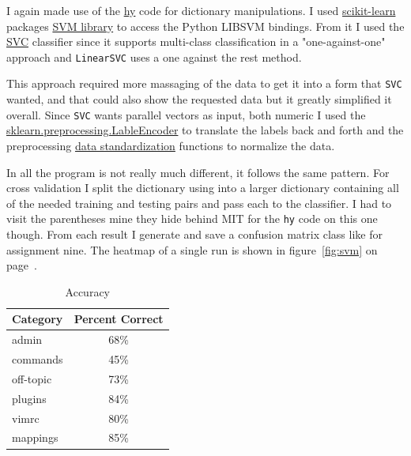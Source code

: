 \documentclass[12pt, a4paper]{article}
\newcommand{\code}[1]{\texttt{#1}}
\begin{document}
I again made use of the \href{https://github.com/hylang/hy}{hy} code for dictionary manipulations. I used \href{http://scikit-learn.org/stable/documentation.html}{scikit-learn} packages \href{http://scikit-learn.org/stable/modules/svm.html}{SVM library} to access the Python LIBSVM bindings. From it I used the \href{http://scikit-learn.org/stable/modules/generated/sklearn.svm.SVC.html#sklearn.svm.SVC}{SVC} classifier since it supports multi-class classification in a "one-against-one" approach and \code{LinearSVC} uses a one against the rest method.

This approach required more massaging of the data to get it into a form that \code{SVC} wanted, and that could also show the requested data but it greatly simplified it overall. Since \code{SVC} wants parallel vectors as input, both numeric I used the \href{http://scikit-learn.org/stable/modules/generated/sklearn.preprocessing.LabelEncoder.html}{sklearn.preprocessing.LableEncoder} to translate the labels back and forth and the preprocessing \href{http://scikit-learn.org/stable/modules/preprocessing.html#preprocessing}{data standardization} functions to normalize the data.

In all the program is not really much different, it follows the same pattern. For cross validation I split the dictionary using into a larger dictionary containing all of the needed training and testing pairs and pass each to the classifier. I had to visit the parentheses mine they hide behind MIT for the \code{hy} code on this one though. From each result I generate and save a confusion matrix class like for assignment nine. The heatmap of a single run is shown in figure~\ref{fig:svm} on page~\pageref{fig:svm}.

\begin{table}[H]
    \centering
    \caption{Accuracy}
    \label{tab:5050}
    \begin{tabular}{lc}
    \hline
    Category    & Percent Correct \\
    \hline
    admin       & 68\%  \\
    commands    & 45\%  \\
    off-topic   & 73\%  \\
    plugins     & 84\%  \\
    vimrc       & 80\%  \\
    mappings    & 85\%  \\
    \hline
    \end{tabular}
\end{table}
\end{document}
